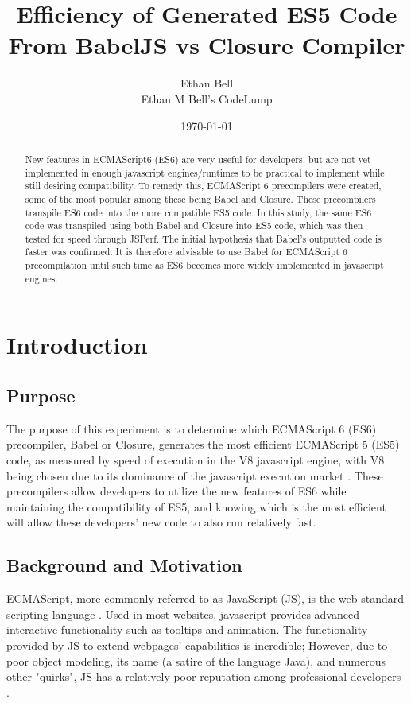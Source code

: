 \documentclass[12pt]{article}
\title{Efficiency of Generated ES5 Code From BabelJS vs Closure Compiler}
\author{Ethan Bell \\ Ethan M Bell's CodeLump}
\date{\today}
\begin{document}
\maketitle
\begin{abstract}
New features in ECMAScript6 (ES6) are very useful for developers, but are not yet implemented in enough javascript engines/runtimes to be practical to implement while still desiring compatibility. To remedy this, ECMAScript 6 precompilers were created, some of the most popular among these being Babel and Closure. These precompilers transpile ES6 code into the more compatible ES5 code. In this study, the same ES6 code was transpiled using both Babel and Closure into ES5 code, which was then tested for speed through JSPerf. The initial hypothesis that Babel's outputted code is faster was confirmed. It is therefore advisable to use Babel for ECMAScript 6 precompilation until such time as ES6 becomes more widely implemented in javascript engines.
\end{abstract}

\thispagestyle{empty}
\clearpage


\tableofcontents
\thispagestyle{empty}
\clearpage


\setcounter{page}{1}
\setlength{\parindent}{0cm}
\setlength{\parskip}{1em}

\section{Introduction}
\subsection{Purpose}
The purpose of this experiment is to determine which ECMAScript 6 (ES6) precompiler, Babel or Closure, generates the most efficient ECMAScript 5 (ES5) code, as measured by speed of execution in the V8 javascript engine, with V8 being chosen due to its dominance of the javascript execution market \cite{jsstats}. These precompilers allow developers to utilize the new features of ES6 while maintaining the compatibility of ES5, and knowing which is the most efficient will allow these developers' new code to also run relatively fast.
\subsection{Background and Motivation}
ECMAScript, more commonly referred to as JavaScript (JS), is the web-standard scripting language \cite{crockpop}. Used in most websites, javascript provides advanced interactive functionality such as tooltips and animation. The functionality provided by JS to extend webpages' capabilities is incredible; However, due to poor object modeling, its name (a satire of the language Java), and numerous other "quirks", JS has a relatively poor reputation among professional developers \cite{crockpop}.
\end{document}
